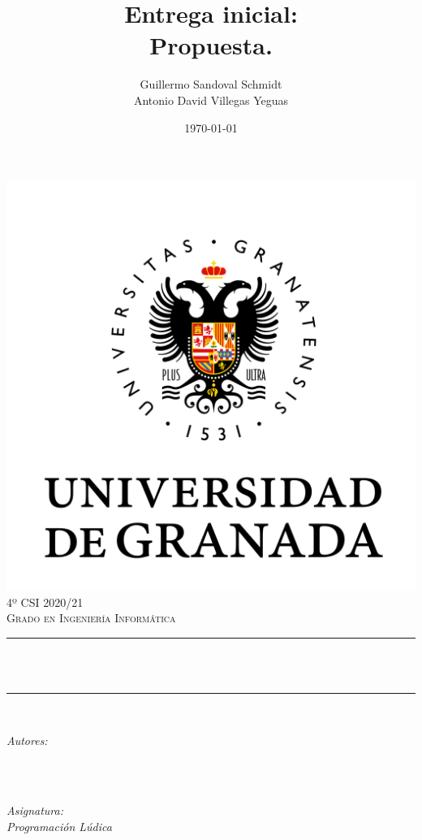 \documentclass[12pt, spanish]{article}
\title{Entrega inicial:\\
Propuesta.\hspace{0.05cm} }
\author{Guillermo Sandoval Schmidt\\ Antonio David Villegas Yeguas}
\date{\today}
\makeatletter
\let\thetitle\@title
\let\theauthor\@author
\makeatother
\begin{document}

\begin{titlepage}
    \centering
    \vspace*{0.3 cm}
    \includegraphics[scale = 0.50]{ugr.png}\\[0.7 cm]
    \textsc{\large 4º CSI 2020/21}\\[0.5 cm]
    \textsc{\large Grado en Ingeniería Informática}\\[0.5 cm]
    \rule{\linewidth}{0.2 mm} \\[0.2 cm]
    { \huge \bfseries \thetitle}\\
    \rule{\linewidth}{0.2 mm} \\[1 cm]

    \begin{minipage}{0.4\textwidth}
        \begin{flushleft} \large
            \emph{Autores:}\\
            \theauthor\\
            \end{flushleft}
            \end{minipage}~
            \begin{minipage}{0.4\textwidth}
            \begin{flushright} \large
            \emph{Asignatura: \\
            Programación Lúdica}   \\
        \end{flushright}
    \end{minipage}\\[0.5cm]


\end{titlepage}
\end{document}
